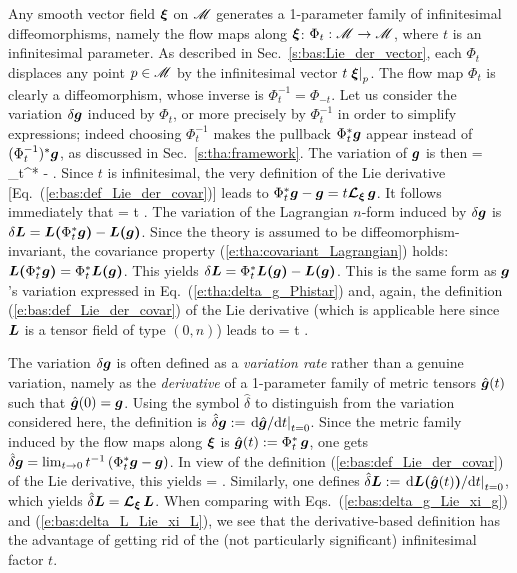 Any smooth vector field $\bm{\xi}$ on $\mathscr{M}$ generates a 1-parameter family of
infinitesimal diffeomorphisms, namely the flow maps along $\bm{\xi}$:
$\Phi_t: \mathscr{M} \to \mathscr{M}$, where
$t$ is an infinitesimal parameter. As described in Sec.~\ref{s:bas:Lie_der_vector}, each $\Phi_t$ displaces any point $p\in\mathscr{M}$ by the infinitesimal vector $t\left.\bm{\xi}\right| _p$.
The flow map $\Phi_t$ is clearly a diffeomorphism, whose inverse is $\Phi_t^{-1} = \Phi_{-t}$.
Let us consider the variation $\delta\bm{g}$ induced by $\Phi_t$,
or more precisely by $\Phi_t^{-1}$ in order to simplify expressions;
indeed
choosing $\Phi_t^{-1}$ makes the pullback $\Phi_t^*\bm{g}$ appear instead of
$(\Phi_t^{-1})^*\bm{g}$, as discussed in Sec.~\ref{s:tha:framework}.
The variation of $\bm{g}$ is then
\be \label{e:tha:delta_g_Phistar}
    \delta{} = \Phi_t^*  -  .
\ee
Since $t$ is infinitesimal, the very definition of the
Lie derivative [Eq.~(\ref{e:bas:def_Lie_der_covar})] leads to
$\Phi_t^*\bm{g} - \bm{g} = t \bm{\mathcal{L}}_{\bm{\xi}}\, \bm{g}$.
It follows immediately that
\be  \label{e:bas:delta_g_Lie_xi_g}
    \delta{} = t \Lie{\xi}  .
\ee
The variation of the Lagrangian $n$-form induced by $\delta\bm{g}$
is $\delta\bm{L} = \bm{L}\textbf{(}\Phi_t^*\bm{g}\textbf{)} - \bm{L}\textbf{(}\bm{g}\textbf{)}$.
Since the theory is assumed to be diffeomorphism-invariant, the covariance property
(\ref{e:tha:covariant_Lagrangian}) holds: $\bm{L}\textbf{(}\Phi_t^*\bm{g}\textbf{)} = \Phi_t^*\bm{L}\textbf{(}\bm{g}\textbf{)}$.
This yields $\delta\bm{L} = \Phi_t^* \bm{L}\textbf{(}\bm{g}\textbf{)} - \bm{L}\textbf{(}\bm{g}\textbf{)}$. This
is the same form as $\bm{g}$'s variation expressed in Eq.~(\ref{e:tha:delta_g_Phistar}) and, again, the
definition (\ref{e:bas:def_Lie_der_covar}) of the Lie derivative (which is applicable here since
$\bm{L}$ is a tensor field of type $(0,n)$) leads to
\be \label{e:bas:delta_L_Lie_xi_L}
    \delta{} = t \Lie{\xi}  .
\ee

\begin{remark}
The variation $\delta\bm{g}$ is often defined as a \emph{variation rate} rather than a genuine variation, namely
as the \emph{derivative} of a 1-parameter family of metric tensors $\hat{\bm{g}}(t)$ such that
$\hat{\bm{g}}(0) = \bm{g}$. Using the symbol $\hat\delta$ to distinguish from the variation considered here,
the definition is
$\hat{\delta}\bm{g} := \left. \mathrm{d}{\hat{\bm{g}}}/\mathrm{d}{t} \right|_{t=0}$.
Since the metric family induced by the flow maps along $\bm{\xi}$ is
$\hat{\bm{g}}(t) := \Phi_t^*\, \bm{g}$, one gets
$\hat{\delta}\bm{g} = \lim_{t\to 0} t^{-1} \left( \Phi_t^* \bm{g} - \bm{g} \right)$.
In view of the definition (\ref{e:bas:def_Lie_der_covar}) of the Lie derivative, this yields
\be \label{e:tha:hat_delta_g_Lie}
    \hat{\delta} =  \Lie{\xi}  .
\ee
Similarly, one defines
$\hat{\delta}\bm{L} :=  \left. \mathrm{d}{\bm{L}\textbf{(}\hat{\bm{g}}(t)\textbf{)}}/\mathrm{d} t \right|_{t=0}$,
which yields $\hat{\delta}\bm{L} =  \bm{\mathcal{L}}_{\bm{\xi}}\, \bm{L}$.
When comparing with Eqs.~(\ref{e:bas:delta_g_Lie_xi_g}) and (\ref{e:bas:delta_L_Lie_xi_L}), we see that the derivative-based definition has the advantage of getting rid of the (not particularly significant) infinitesimal factor $t$.
\end{remark}

